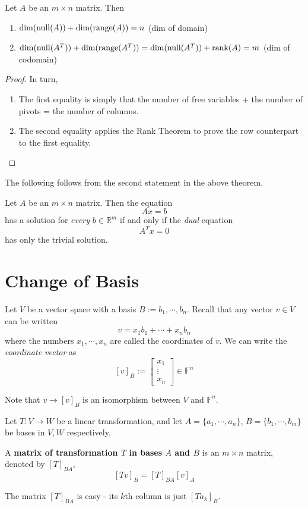 \begin{theorem}
Let $A$ be an $m \times n$ matrix. Then 
\begin{enumerate}
	\item $\operatorname{dim}(\operatorname{null}(A)) + \operatorname{dim}(\operatorname{range}(A)) = n$ (dim of domain)
	\item $\operatorname{dim}(\operatorname{null}(A^{T})) + \operatorname{dim}(\operatorname{range}(A^{T})) = \operatorname{dim}(\operatorname{null}(A^{T})) + \operatorname{rank}(A) = m$ (dim of codomain)
\end{enumerate}
\end{theorem}

\begin{proof}
In turn, 
\begin{enumerate}
	\item The first equality is simply that the number of free variables + the number of pivots = the number of columns. 
	\item The second equality applies the Rank Theorem to prove the row counterpart to the first equality. 
\end{enumerate}
\end{proof}

The following follows from the second statement in the above theorem. 
\begin{theorem}
Let $A$ be an $m \times n$ matrix. Then the equation 
$$Ax = b$$ 
has a solution for \textit{every} $b \in \mathbb{R}^{m}$ if and only if the \textit{dual} equation 
$$A^{T}x = 0$$ 
has only the trivial solution. 
\end{theorem}

\section{Change of Basis}
Let $V$ be a vector space with a basis $B := b_{1}, \cdots, b_{n}$. Recall that any vector $v \in V$ can be written
$$v = x_{1} b_{1} + \cdots + x_{n} b_{n}$$
where the numbers $x_{1}, \cdots, x_{n}$ are called the coordinates of $v$. We can write the \textit{coordinate vector} as 
$$[v]_{B} := \begin{bmatrix}
x_{1} \\
\vdots \\
x_{n}
\end{bmatrix} \in \mathbb{F}^{n}$$

Note that $v \rightarrow [v]_{B}$ is an isomorphism between $V$ and $\mathbb{F}^{n}$.

\begin{definition}
Let $T: V \rightarrow W$ be a linear transformation, and let $A = \{a_{1}, \cdots, a_{n}\}$, $B = \{ b_{1}, \cdots, b_{m} \}$ be bases in $V,W$ respectively. 

A \textbf{matrix of transformation $T$ in bases $A$ and $B$} is an $m \times n$ matrix, denoted by $[T]_{BA}$, 
$$[Tv]_{B} = [T]_{BA} [v]_{A}$$

The matrix $[T]_{BA}$ is easy - its $k$th column is just $[Ta_{k}]_{B}$. 
\end{definition}

